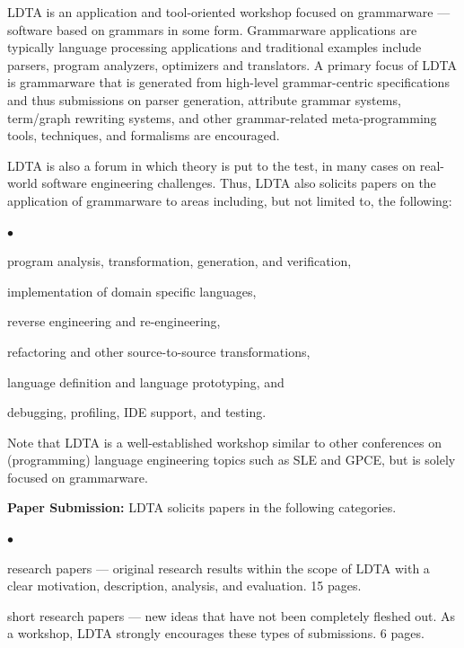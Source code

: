 \documentclass[10pt,A4paper]{article}
\newenvironment{inditemlist}{
                         \begin{list}{{$\bullet$}} 
                         {\setlength{\itemsep}{0pt} 
                         \setlength{\topsep}{0pt} 
                         \setlength{\partopsep}{2pt}
                         \setlength{\leftmargin}{12pt} 
                         \setlength{\labelwidth}{8pt} 
                         \setlength{\labelsep}{2pt} 
                         \setlength{\listparindent}{0pt}
                         \setlength{\parsep}{0.07cm}
                         \usecounter{enumi} 
                         \setlength{\parskip}{0.2cm}}}{\end{list}\vspace{2mm} }
\begin{document}
\begin{minipage}[t]{5.1in}
LDTA is an application and tool-oriented workshop focused on
grammarware --- software based on grammars in some form.  Grammarware
applications are typically language processing applications and
traditional examples include parsers, program analyzers, optimizers
and translators.  A primary focus of LDTA is grammarware that is
generated from high-level grammar-centric specifications and thus
submissions on parser generation, attribute grammar systems,
term/graph rewriting systems, and other grammar-related
meta-programming tools, techniques, and formalisms are encouraged.

LDTA is also a forum in which theory is put to the test, in many cases
on real-world software engineering challenges.  Thus, LDTA also
solicits papers on the application of grammarware to areas including,
but not limited to, the following:
\begin{inditemlist}
\item program analysis, transformation, generation, and verification,
\item implementation of domain specific languages,
\item reverse engineering and re-engineering,
\item refactoring and other source-to-source transformations,
\item language definition and language prototyping, and
\item debugging, profiling, IDE support, and testing.
\end{inditemlist}

Note that LDTA is a well-established workshop similar to other
conferences on (programming) language engineering topics such as SLE
and GPCE, but is solely focused on grammarware.

\medskip
\textbf{Paper Submission:}
LDTA solicits papers in the following categories.
\begin{inditemlist}
\item research papers --- original research results within the scope of LDTA
  with a clear motivation, description, analysis, and evaluation. 15 pages.

\item short research papers --- new ideas that have not been
  completely fleshed out.  As a workshop, LDTA strongly encourages
  these types of submissions. 6 pages.


\end{inditemlist}
\end{minipage}
\end{document}
